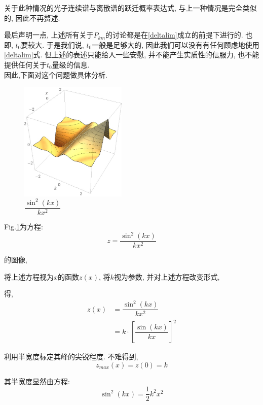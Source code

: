 \documentclass[a4paper, 11pt]{article}
\begin{document}
\begin{spacing}{1.2}
        关于此种情况的光子连续谱与离散谱的跃迁概率表达式, 与上一种情况是完全类似的, 因此不再赘述.
         
        最后声明一点, 上述所有关于$P_{km}$的讨论都是在\eqref{deltalim}成立的前提下进行的.
        也即, $t_0$要较大. 于是我们说, $t_0$一般是足够大的, 因此我们可以没有有任何顾虑地使用\eqref{deltalim}式.
        但上述的表述只能给人一些安慰, 并不能产生实质性的信服力, 
        也不能提供任何关于$t_0$量级的信息.\\
        因此,下面对这个问题做具体分析.
        \begin{figure}[H]
          \centering\includegraphics[width=2in]{image/delta.jpg}
          \caption{$\dfrac{\sin^2(kx)}{kx^2}$}\label{pic_delta}
        \end{figure} 

        Fig.\ref{pic_delta}为方程: 
        \begin{equation}
          z = \dfrac{\sin^2(kx)}{kx^2}
        \end{equation}
        
        的图像,
        \par
        将上述方程视为$x$的函数$z(x)$, 将$k$视为参数, 并对上述方程改变形式,
        \par
        得, 
        \begin{equation}
          \begin{aligned}
            z(x) & = \dfrac{\sin^2(kx)}{kx^2}\\ 
              & = k\cdot\left[\dfrac{\sin(kx)}{kx}\right]^2
          \end{aligned}
        \end{equation}

        利用半宽度标定其峰的尖锐程度.
        不难得到,
        \begin{equation}
          z_{max}(x) = z(0) = k
        \end{equation}

        其半宽度显然由方程:
        \begin{equation}
          \sin^2(kx) = \dfrac{1}{2}k^2x^2
        \end{equation}
        

\end{spacing}
\end{document}
